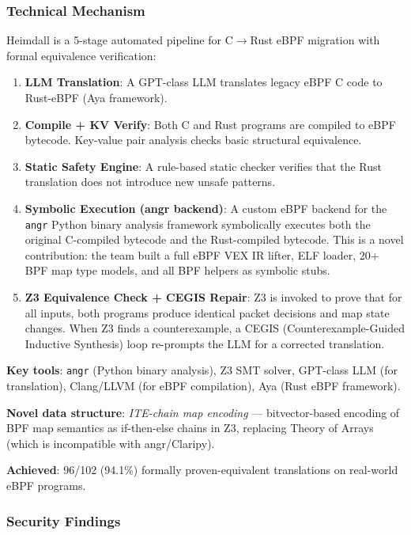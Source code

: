 \documentclass[12pt, a4paper]{article}
\begin{document}
\subsubsection{Technical Mechanism}

Heimdall is a 5-stage automated pipeline for C$\to$Rust eBPF migration with formal equivalence verification:

\begin{enumerate}
  \item \textbf{LLM Translation}: A GPT-class LLM translates legacy eBPF C code to Rust-eBPF (Aya framework).
  \item \textbf{Compile + KV Verify}: Both C and Rust programs are compiled to eBPF bytecode. Key-value pair analysis checks basic structural equivalence.
  \item \textbf{Static Safety Engine}: A rule-based static checker verifies that the Rust translation does not introduce new unsafe patterns.
  \item \textbf{Symbolic Execution (angr backend)}: A custom eBPF backend for the \texttt{angr} Python binary analysis framework symbolically executes both the original C-compiled bytecode and the Rust-compiled bytecode. This is a novel contribution: the team built a full eBPF VEX IR lifter, ELF loader, 20+ BPF map type models, and all BPF helpers as symbolic stubs.
  \item \textbf{Z3 Equivalence Check + CEGIS Repair}: Z3 is invoked to prove that for all inputs, both programs produce identical packet decisions and map state changes. When Z3 finds a counterexample, a CEGIS (Counterexample-Guided Inductive Synthesis) loop re-prompts the LLM for a corrected translation.
\end{enumerate}

\textbf{Key tools}: \texttt{angr} (Python binary analysis), Z3 SMT solver, GPT-class LLM (for translation), Clang/LLVM (for eBPF compilation), Aya (Rust eBPF framework).

\textbf{Novel data structure}: \emph{ITE-chain map encoding} --- bitvector-based encoding of BPF map semantics as if-then-else chains in Z3, replacing Theory of Arrays (which is incompatible with angr/Claripy).

\textbf{Achieved}: 96/102 (94.1\%) formally proven-equivalent translations on real-world eBPF programs.

\subsubsection{Security Findings}
\end{document}
